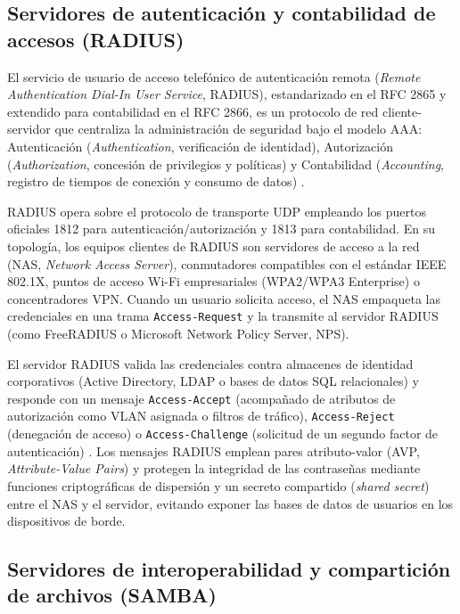 \documentclass[12pt]{article}
\begin{document}
\subsection{Servidores de autenticación y contabilidad de accesos (RADIUS)}
\label{sec:servidoresRadius}

El servicio de usuario de acceso telefónico de autenticación remota (\textit{Remote Authentication Dial-In User Service}, RADIUS), estandarizado en el RFC 2865 y extendido para contabilidad en el RFC 2866, es un protocolo de red cliente-servidor que centraliza la administración de seguridad bajo el modelo AAA: Autenticación (\textit{Authentication}, verificación de identidad), Autorización (\textit{Authorization}, concesión de privilegios y políticas) y Contabilidad (\textit{Accounting}, registro de tiempos de conexión y consumo de datos) \parencite[\S 1, pp.\ 1--4]{rfc2865}.

RADIUS opera sobre el protocolo de transporte UDP empleando los puertos oficiales 1812 para autenticación/autorización y 1813 para contabilidad. En su topología, los equipos clientes de RADIUS son servidores de acceso a la red (NAS, \textit{Network Access Server}), conmutadores compatibles con el estándar IEEE 802.1X, puntos de acceso Wi-Fi empresariales (WPA2/WPA3 Enterprise) o concentradores VPN. Cuando un usuario solicita acceso, el NAS empaqueta las credenciales en una trama \texttt{Access-Request} y la transmite al servidor RADIUS (como FreeRADIUS o Microsoft Network Policy Server, NPS).

El servidor RADIUS valida las credenciales contra almacenes de identidad corporativos (Active Directory, LDAP o bases de datos SQL relacionales) y responde con un mensaje \texttt{Access-Accept} (acompañado de atributos de autorización como VLAN asignada o filtros de tráfico), \texttt{Access-Reject} (denegación de acceso) o \texttt{Access-Challenge} (solicitud de un segundo factor de autenticación) \parencite[\S 2, pp.\ 6--10]{rfc2865}. Los mensajes RADIUS emplean pares atributo-valor (AVP, \textit{Attribute-Value Pairs}) y protegen la integridad de las contraseñas mediante funciones criptográficas de dispersión y un secreto compartido (\textit{shared secret}) entre el NAS y el servidor, evitando exponer las bases de datos de usuarios en los dispositivos de borde.

\subsection{Servidores de interoperabilidad y compartición de archivos (SAMBA)}
\label{sec:servidoresSamba}
\end{document}
